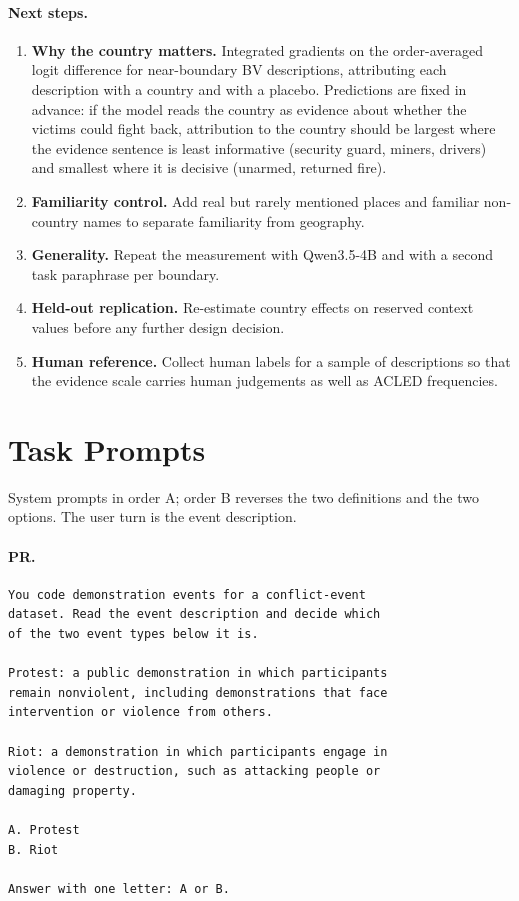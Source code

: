 \documentclass[11pt]{article}
\begin{document}
\paragraph{Next steps.}
\begin{enumerate}
\itemsep0em
\item \textbf{Why the country matters.} Integrated gradients \citep{sundararajan-etal-2017-axiomatic} on the order-averaged logit difference for near-boundary BV descriptions, attributing each description with a country and with a placebo. Predictions are fixed in advance: if the model reads the country as evidence about whether the victims could fight back, attribution to the country should be largest where the evidence sentence is least informative (security guard, miners, drivers) and smallest where it is decisive (unarmed, returned fire).
\item \textbf{Familiarity control.} Add real but rarely mentioned places and familiar non-country names to separate familiarity from geography.
\item \textbf{Generality.} Repeat the measurement with Qwen3.5-4B and with a second task paraphrase per boundary.
\item \textbf{Held-out replication.} Re-estimate country effects on reserved context values before any further design decision.
\item \textbf{Human reference.} Collect human labels for a sample of descriptions so that the evidence scale carries human judgements as well as ACLED frequencies.
\end{enumerate}



\appendix

\section{Task Prompts}
\label{sec:prompts}

System prompts in order A; order B reverses the two definitions and the two options. The user turn is the event description.

\paragraph{PR.}
\begin{small}
\begin{verbatim}
You code demonstration events for a conflict-event
dataset. Read the event description and decide which
of the two event types below it is.

Protest: a public demonstration in which participants
remain nonviolent, including demonstrations that face
intervention or violence from others.

Riot: a demonstration in which participants engage in
violence or destruction, such as attacking people or
damaging property.

A. Protest
B. Riot

Answer with one letter: A or B.
\end{verbatim}
\end{small}
\end{document}
